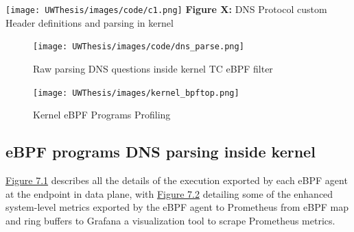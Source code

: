 \documentclass [11pt, proquest] {uwthesis}[2020/02/24]
\begin{document}
\begin{center}
  \texttt{[image: UWThesis/images/code/c1.png]}
  \newline
  \textbf{Figure X:} DNS Protocol custom Header definitions and parsing in kernel
  \label{fig:c1}
\end{center}


\begin{figure}[H]
    \centering
    \texttt{[image: UWThesis/images/code/dns\_parse.png]}
    \caption{Raw parsing DNS questions inside kernel TC eBPF filter}
    \label{fig:c2}
\end{figure}

\begin{figure}[H]
    \centering
    \texttt{[image: UWThesis/images/kernel\_bpftop.png]}
    \caption{Kernel eBPF Programs Profiling}
    \label{fig:c3}
\end{figure}


\subsection{eBPF programs DNS parsing inside kernel}
\hyperref[sec:dp_ebpf_node_metrics]{Figure 7.1} describes all the details of the execution exported by each eBPF agent at the endpoint in data plane, with \hyperref[fig:dns-exfil-packet-metrics]{Figure 7.2} detailing some of the enhanced system-level metrics exported by the eBPF agent to Prometheus from eBPF map and ring buffers to Grafana a visualization tool to scrape Prometheus metrics.
\end{document}
